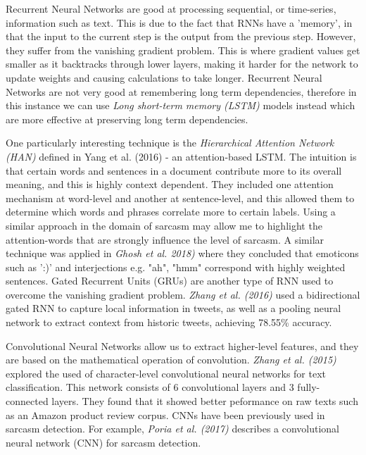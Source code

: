 \documentclass[12pt,a4paper]{article}
\begin{document}
Recurrent Neural Networks are good at processing sequential, or time-series, information such as text. This is due to the fact that RNNs have a 'memory', in that the input to the current step is the output from the previous step. However, they suffer from the vanishing gradient problem. This is where gradient values get smaller as it backtracks through lower layers, making it harder for the network to update weights and causing calculations to take longer. Recurrent Neural Networks are not very good at remembering long term dependencies, therefore in this instance we can use \textit{Long short-term memory (LSTM)} models \cite{hochreiter1997long} instead which are more effective at preserving long term dependencies.

One particularly interesting technique is the \textit{Hierarchical Attention Network (HAN)} defined in Yang et al. (2016) \cite{yang2016hierarchical} - an attention-based LSTM. The intuition is that certain words and sentences in a document contribute more to its overall meaning, and this is highly context dependent. They included one attention mechanism at word-level and another at sentence-level, and this allowed them to determine which words and phrases correlate more to certain labels. Using a similar approach in the domain of sarcasm may allow me to highlight the attention-words that are strongly influence the level of sarcasm. A similar technique was applied in \textit{Ghosh et al. 2018)} \cite{ghosh2018sarcasm} where they concluded that emoticons such as ':)' and interjections e.g. "ah", "hmm" correspond with highly weighted sentences. 
Gated Recurrent Units (GRUs) are another type of RNN used to overcome the vanishing gradient problem.  \textit{Zhang et al. (2016)} \cite{zhang2016tweet} used a bidirectional gated RNN to capture local information in tweets, as well as a pooling neural network to extract context from historic tweets, achieving 78.55\% accuracy.

Convolutional Neural Networks allow us to extract higher-level features, and they are based on the mathematical operation of convolution. \textit{Zhang et al. (2015)}  \cite{zhang2015character} explored the used of character-level convolutional neural networks for text classification. This network consists of 6 convolutional layers and 3 fully-connected layers. They found that it showed better peformance on raw texts such as an Amazon product review corpus. CNNs have been previously used in sarcasm detection. For example, \textit{Poria et al. (2017)} \cite{poria2016deeper} describes a convolutional neural network (CNN) for sarcasm detection. \\
\end{document}
